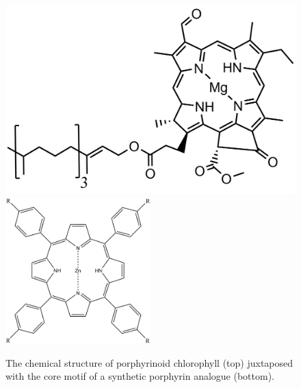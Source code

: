 \begin{figure}
    \centering
    \includegraphics[width = \textwidth]{images/PDIpy/background/chlorophyll.png} \\
    \midrule
    \includegraphics[width = 0.5\textwidth]{images/PDIpy/background/zinc_porphyrin.png}
    \caption{
        The chemical structure of porphyrinoid chlorophyll (top) juxtaposed with the core motif of a synthetic porphyrin analogue (bottom).
    }
    \label{zinc_porphyrin}
\end{figure}


